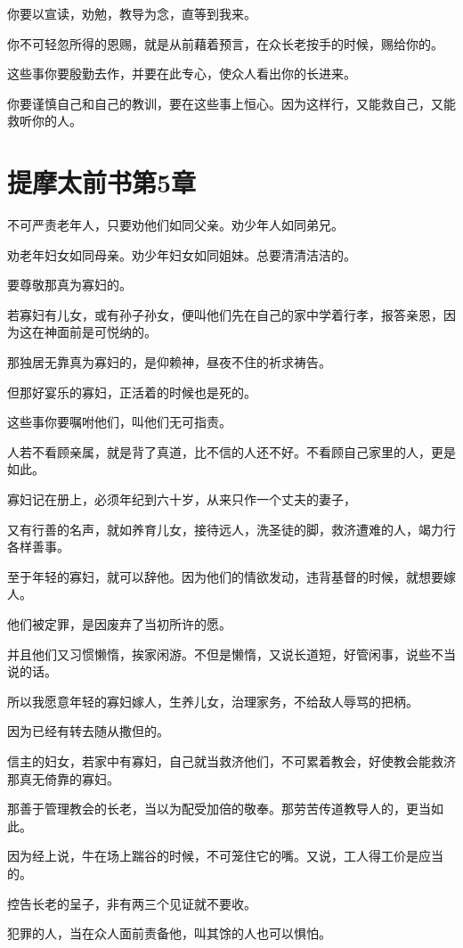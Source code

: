 \documentclass[12pt,oneside]{book}
\begin{document}
你要以宣读，劝勉，教导为念，直等到我来。

你不可轻忽所得的恩赐，就是从前藉着预言，在众长老按手的时候，赐给你的。

这些事你要殷勤去作，并要在此专心，使众人看出你的长进来。

你要谨慎自己和自己的教训，要在这些事上恒心。因为这样行，又能救自己，又能救听你的人。

\chapter{提摩太前书第5章}
不可严责老年人，只要劝他们如同父亲。劝少年人如同弟兄。

劝老年妇女如同母亲。劝少年妇女如同姐妹。总要清清洁洁的。

要尊敬那真为寡妇的。

若寡妇有儿女，或有孙子孙女，便叫他们先在自己的家中学着行孝，报答亲恩，因为这在神面前是可悦纳的。

那独居无靠真为寡妇的，是仰赖神，昼夜不住的祈求祷告。

但那好宴乐的寡妇，正活着的时候也是死的。

这些事你要嘱咐他们，叫他们无可指责。

人若不看顾亲属，就是背了真道，比不信的人还不好。不看顾自己家里的人，更是如此。

寡妇记在册上，必须年纪到六十岁，从来只作一个丈夫的妻子，

又有行善的名声，就如养育儿女，接待远人，洗圣徒的脚，救济遭难的人，竭力行各样善事。

至于年轻的寡妇，就可以辞他。因为他们的情欲发动，违背基督的时候，就想要嫁人。

他们被定罪，是因废弃了当初所许的愿。

并且他们又习惯懒惰，挨家闲游。不但是懒惰，又说长道短，好管闲事，说些不当说的话。

所以我愿意年轻的寡妇嫁人，生养儿女，治理家务，不给敌人辱骂的把柄。

因为已经有转去随从撒但的。

信主的妇女，若家中有寡妇，自己就当救济他们，不可累着教会，好使教会能救济那真无倚靠的寡妇。

那善于管理教会的长老，当以为配受加倍的敬奉。那劳苦传道教导人的，更当如此。

因为经上说，牛在场上踹谷的时候，不可笼住它的嘴。又说，工人得工价是应当的。

控告长老的呈子，非有两三个见证就不要收。

犯罪的人，当在众人面前责备他，叫其馀的人也可以惧怕。
\end{document}
